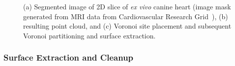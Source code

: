 \begin{figure}[htbp!]
{\label{fig:d2dvor2}}
%
\caption{(a) Segmented image of 2D slice of \textit{ex vivo} canine heart (image mask generated from MRI data from Cardiovascular Research Grid~\cite{cvgg}), (b) resulting point cloud, and (c) Voronoi site placement and subsequent Voronoi partitioning and surface extraction.}
\label{fig:d2dvor}
\end{figure}

\subsubsection{Surface Extraction and Cleanup}

